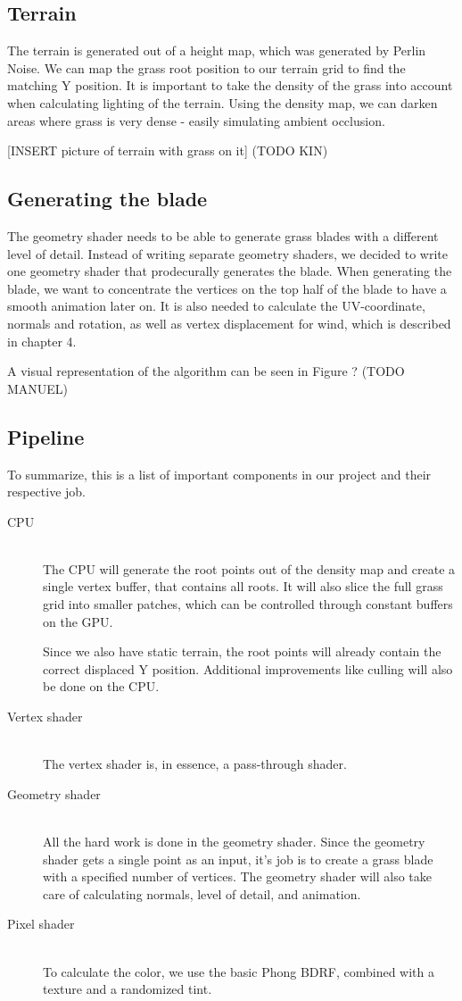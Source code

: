\documentclass[conference]{acmsiggraph}
\begin{document}
\subsection{Terrain}
The terrain is generated out of a height map, which was generated by Perlin Noise. We can map the grass root position to our terrain grid to find the matching Y position. It is important to take the density of the grass into account when calculating lighting of the terrain. Using the density map, we can darken areas where grass is very dense - easily simulating ambient occlusion.

[INSERT picture of terrain with grass on it] (TODO KIN)

\subsection{Generating the blade}
The geometry shader needs to be able to generate grass blades with a different level of detail. Instead of writing separate geometry shaders, we decided to write one geometry shader that prodecurally generates the blade. When generating the blade, we want to concentrate the vertices on the top half of the blade to have a smooth animation later on. It is also needed to calculate the UV-coordinate, normals and rotation, as well as vertex displacement for wind, which is described in chapter 4.

A visual representation of the algorithm can be seen in Figure {?} (TODO MANUEL)

\subsection{Pipeline}
To summarize, this is a list of important components in our project and their respective job.
\begin{description}
  \item[CPU] \hfill \\
  The CPU will generate the root points out of the density map and create a single vertex buffer, that contains all roots. It will also slice the full grass grid into smaller patches, which can be controlled through constant buffers on the GPU.
  
  Since we also have static terrain, the root points will already contain the correct displaced Y position. Additional improvements like culling will also be done on the CPU.
  \item[Vertex shader] \hfill \\
  The vertex shader is, in essence, a pass-through shader.
  \item[Geometry shader] \hfill \\
  All the hard work is done in the geometry shader. Since the geometry shader gets a single point as an input, it's job is to create a grass blade with a specified number of vertices. The geometry shader will also take care of calculating normals, level of detail, and animation.
  \item[Pixel shader] \hfill \\
  To calculate the color, we use the basic Phong BDRF, combined with a texture and a randomized tint.
\end{description}
\end{document}
